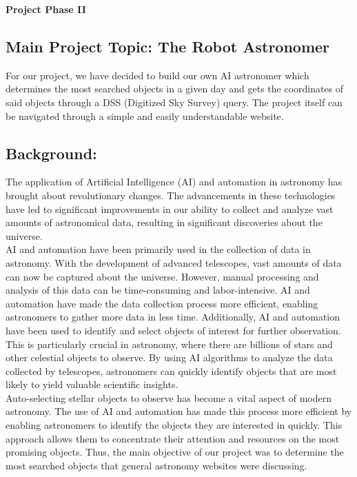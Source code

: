 \documentclass[12pt,letterpaper]{article}
\begin{document}
  \thispagestyle{firstpagestyle}
  \begin{center}
    {\huge \textbf{Project Phase II}}
  \end{center}

    
\subsection*{Main Project Topic: The Robot Astronomer}
\quad For our project, we have decided to build our own AI astronomer which determines the most 
searched objects in a given day and gets the coordinates of said objects through a DSS (Digitized 
Sky Survey) query. The project itself can be navigated through a simple and easily understandable 
website. \\

\subsection*{Background:}
\quad The application of Artificial Intelligence (AI) and automation in astronomy has brought 
about revolutionary changes. The advancements in these technologies have led to significant 
improvements in our ability to collect and analyze vast amounts of astronomical data, resulting 
in significant discoveries about the universe. \\

\quad AI and automation have been primarily used in the collection of data in astronomy. With the 
development of advanced telescopes, vast amounts of data can now be captured about the 
universe. However, manual processing and analysis of this data can be time-consuming and 
labor-intensive. AI and automation have made the data collection process more efficient, enabling 
astronomers to gather more data in less time. Additionally, AI and automation have been used to 
identify and select objects of interest for further observation. This is particularly crucial in 
astronomy, where there are billions of stars and other celestial objects to observe. By using AI 
algorithms to analyze the data collected by telescopes, astronomers can quickly identify 
objects that are most likely to yield valuable scientific insights. \\

\quad Auto-selecting stellar objects to observe has become a vital aspect of modern astronomy. The 
use of AI and automation has made this process more efficient by enabling astronomers to identify 
the objects they are interested in quickly. This approach allows them to concentrate their attention 
and resources on the most promising objects. Thus, the main objective of our project was to 
determine the most searched objects that general astronomy websites were discussing.  \\
\end{document}
